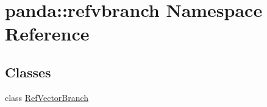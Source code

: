 \hypertarget{namespacepanda_1_1refvbranch}{
\section{panda::refvbranch Namespace Reference}
\label{namespacepanda_1_1refvbranch}
}
\subsection*{Classes}
\begin{DoxyCompactItemize}
\item 
class \hyperlink{classpanda_1_1refvbranch_1_1RefVectorBranch}{RefVectorBranch}
\end{DoxyCompactItemize}
